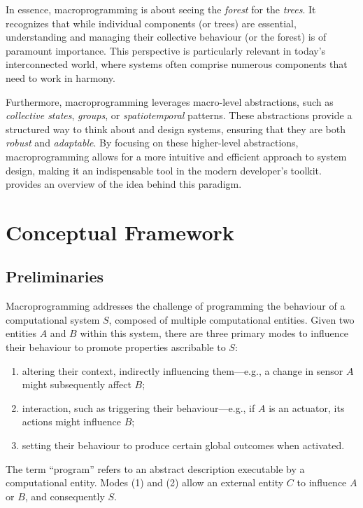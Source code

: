 In essence, macroprogramming is about seeing the \emph{forest} for the \emph{trees}. 
 It recognizes that while individual components (or trees) are essential,
 understanding and managing their collective behaviour (or the forest) is of paramount importance. 
This perspective is particularly relevant in today's interconnected world, 
 where systems often comprise numerous components that need to work in harmony.

Furthermore, macroprogramming leverages macro-level abstractions, 
 such as \emph{collective states}, \emph{groups}, or \emph{spatiotemporal} patterns. 
 These abstractions provide a structured way to think about and design systems, 
 ensuring that they are both \emph{robust} and \emph{adaptable}. 
By focusing on these higher-level abstractions, 
 macroprogramming allows for a more intuitive and efficient approach to system design, 
 making it an indispensable tool in the modern developer's toolkit.
 provides an overview of the idea behind this paradigm.

\section{Conceptual Framework}

\subsection{Preliminaries}
Macroprogramming addresses the challenge of programming the behaviour of a computational system \( S \), composed of multiple computational entities. 
 Given two entities \( A \) and \( B \) within this system, 
 there are three primary modes to influence their behaviour to promote properties ascribable to \( S \):
\begin{enumerate}
    \item altering their context, 
    indirectly influencing them---e.g., a change in sensor \( A \) might subsequently affect \( B \);
    \item interaction, such as triggering their behaviour---e.g.,  if \( A \) is an actuator, its actions might influence \( B \);
    \item setting their behaviour to produce certain global outcomes when activated.
\end{enumerate}
The term ``program'' refers to an abstract description executable by a computational entity. 
 Modes (1) and (2) allow an external entity \( C \) to influence \( A \) or \( B \), and consequently \( S \).

